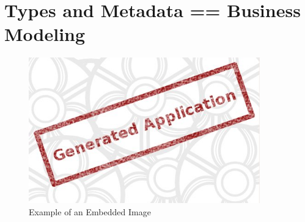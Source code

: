 \section{Types and Metadata == Business Modeling}\label{sec:02}

  
  \begin{figure}[!htp]
    \centering
    \includegraphics[width=10cm]{sections/01-intro/images/00-splash.jpg}
    \caption{Example of an Embedded Image}\label{fig:01}
  \end{figure}

 
